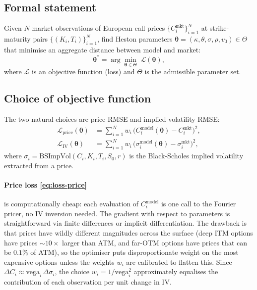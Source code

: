\documentclass[11pt]{article}
\theoremstyle{plain}
\theoremstyle{definition}
\theoremstyle{remark}
\begin{document}
\subsection{Formal statement}

Given $N$ market observations of European call prices $\{C_i^{\mathrm{mkt}}\}_{i=1}^N$ at strike-maturity pairs $\{(K_i, T_i)\}_{i=1}^N$, find Heston parameters $\boldsymbol{\theta} = (\kappa, \theta, \sigma, \rho, v_0) \in \Theta$ that minimise an aggregate distance between model and market:
\begin{equation}
    \boldsymbol{\theta}^* = \arg\min_{\boldsymbol{\theta} \in \Theta}\; \mathcal{L}(\boldsymbol{\theta}),                                                                                              \label{eq:calib-problem}
\end{equation}
where $\mathcal{L}$ is an objective function (loss) and $\Theta$ is the admissible parameter set.

\subsection{Choice of objective function}

The two natural choices are price RMSE and implied-volatility RMSE:
\begin{align}
    \mathcal{L}_{\mathrm{price}}(\boldsymbol{\theta}) &= \sum_{i=1}^N w_i\, \bigl(C_i^{\mathrm{model}}(\boldsymbol{\theta}) - C_i^{\mathrm{mkt}}\bigr)^2, \label{eq:loss-price}\\
    \mathcal{L}_{\mathrm{IV}}(\boldsymbol{\theta}) &= \sum_{i=1}^N w_i\, \bigl(\sigma_i^{\mathrm{model}}(\boldsymbol{\theta}) - \sigma_i^{\mathrm{mkt}}\bigr)^2,                                                                                                  \label{eq:loss-iv}
\end{align}
where $\sigma_i = \mathrm{BSImpVol}(C_i, K_i, T_i, S_0, r)$ is the Black-Scholes implied volatility extracted from a price.

\paragraph{Price loss \eqref{eq:loss-price}} is computationally cheap: each evaluation of $C_i^{\mathrm{model}}$ is one call to the Fourier pricer, no IV inversion needed. The gradient with respect to parameters is straightforward via finite differences or implicit differentiation. The drawback is that prices have wildly different magnitudes across the surface (deep ITM options have prices $\sim 10\times$ larger than ATM, and far-OTM options have prices that can be $0.1\%$ of ATM), so the optimiser puts disproportionate weight on the most expensive options unless the weights $w_i$ are calibrated to flatten this. Since $\Delta C_i \approx \mathrm{vega}_i\, \Delta\sigma_i$, the choice $w_i = 1 / \mathrm{vega}_i^2$ approximately equalises the contribution of each observation per unit change in IV.
\end{document}
